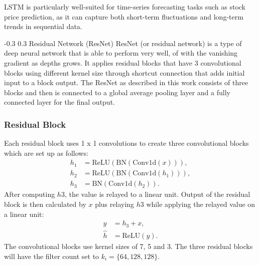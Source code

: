 \documentclass[twocolumn]{llncs}
\makeatletter
\renewcommand{\subsection}{\@startsection{subsection}{2}{\z@}%
  {-0.3\baselineskip}  %
  {0.3\baselineskip}   %
  {\normalfont\normalsize\bfseries}}
\makeatother
\begin{document}
\noindent LSTM is particularly well-suited for time-series forecasting tasks such as stock price prediction, as it can capture both short-term fluctuations and long-term trends in sequential data.


\subsection{Residual Network (ResNet)}\label{sec:intro}
ResNet (or residual network) is a type of deep neural network that is able to perform very well, of with the vanishing gradient as depths grows. It applies residual blocks that have 3 convolutional blocks using different kernel size through shortcut connection that adds initial input to a block output. The ResNet as described in this work consists of three blocks and then is connected to a global average pooling layer and a fully connected layer for the final output.

\subsubsection{Residual Block}
Each residual block uses 1 x 1 convolutions to create three convolutional blocks which are set up as follows:
\begin{align}
h_1 &= \text{ReLU}(\text{BN}(\text{Conv1d}(x))), \label{eq:h1} \\
h_2 &= \text{ReLU}(\text{BN}(\text{Conv1d}(h_1))), \label{eq:h2} \\
h_3 &= \text{BN}(\text{Conv1d}(h_2)). \label{eq:h3}
\end{align}
After computing \(h3\), the value is relayed to a linear unit. Output of the residual block is then calculated by \(x\) plus relaying \(h3\) while applying the relayed value on a linear unit:
\begin{align}
y &= h_3 + x, \label{eq:y} \\
\hat{h} &= \text{ReLU}(y). \label{eq:hhat}
\end{align}
The convolutional blocks use kernel sizes of 7, 5 and 3. The three residual blocks will have the filter count set to \( k_i = \{64, 128, 128\} \).

\end{document}
